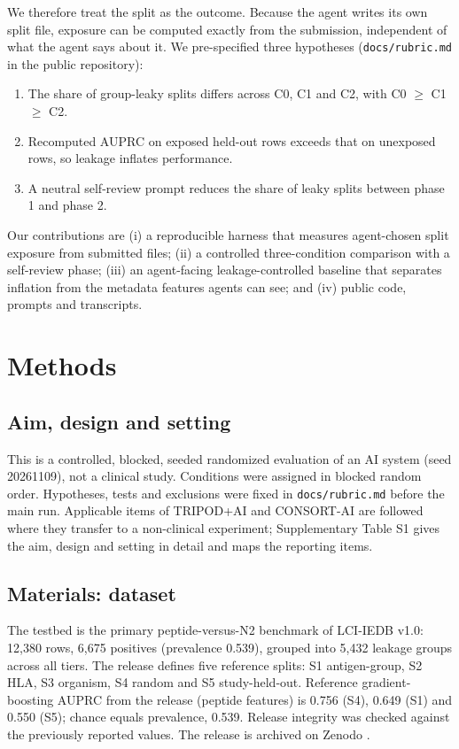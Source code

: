 \documentclass[11pt,a4paper]{article}
\begin{document}
We therefore treat the split as the outcome. Because the agent writes its own split file, exposure can be computed exactly from the submission, independent of what the agent says about it. We pre-specified three hypotheses (\texttt{docs/rubric.md} in the public repository):
\begin{enumerate}
\item[H1] The share of group-leaky splits differs across C0, C1 and C2, with C0 $\geq$ C1 $\geq$ C2.
\item[H2] Recomputed AUPRC on exposed held-out rows exceeds that on unexposed rows, so leakage inflates performance.
\item[H3] A neutral self-review prompt reduces the share of leaky splits between phase 1 and phase 2.
\end{enumerate}
Our contributions are (i) a reproducible harness that measures agent-chosen split exposure from submitted files; (ii) a controlled three-condition comparison with a self-review phase; (iii) an agent-facing leakage-controlled baseline that separates inflation from the metadata features agents can see; and (iv) public code, prompts and transcripts.

\section*{Methods}

\subsection*{Aim, design and setting}
This is a controlled, blocked, seeded randomized evaluation of an AI system (seed 20261109), not a clinical study. Conditions were assigned in blocked random order. Hypotheses, tests and exclusions were fixed in \texttt{docs/rubric.md} before the main run. Applicable items of TRIPOD+AI and CONSORT-AI are followed where they transfer to a non-clinical experiment; Supplementary Table S1 gives the aim, design and setting in detail and maps the reporting items.

\subsection*{Materials: dataset}
The testbed is the primary peptide-versus-N2 benchmark of LCI-IEDB v1.0: 12,380 rows, 6,675 positives (prevalence 0.539), grouped into 5,432 leakage groups across all tiers. The release defines five reference splits: S1 antigen-group, S2 HLA, S3 organism, S4 random and S5 study-held-out. Reference gradient-boosting AUPRC from the release (peptide features) is 0.756 (S4), 0.649 (S1) and 0.550 (S5); chance equals prevalence, 0.539. Release integrity was checked against the previously reported values. The release is archived on Zenodo \cite{LCIIEDB}.
\end{document}
